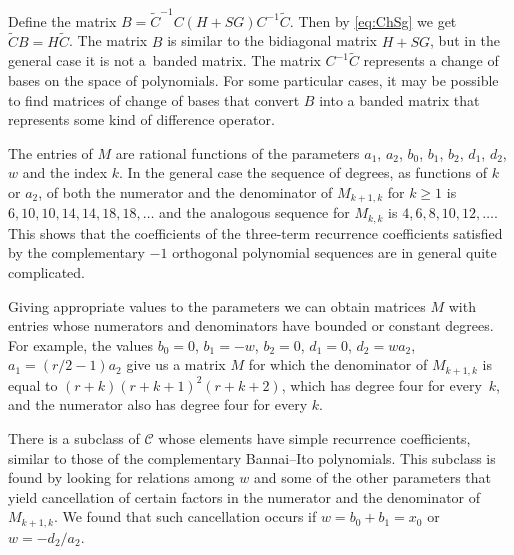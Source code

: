 \documentclass[pdftex]{sigma}
\def\cC{\mathcal C}
\numberwithin{equation}{section}
\begin{document}
Define the matrix
$%
	B={\tilde C}^{-1} C (H+S G)C^{-1} \tilde C$.
Then by \eqref{eq:ChSg} we get
$
	\tilde C B = H \tilde C$.
The matrix $B$ is similar to the bidiagonal matrix $H+ S G$, but in the general case it is not a~banded matrix. The matrix $C^{-1} \tilde C$ represents a change of bases on the space of polynomials. For some particular cases, it may be possible to find matrices of change of bases that convert $B$ into a banded matrix that represents some kind of difference operator.

The entries of $M$ are rational functions of the parameters $a_1$, $a_2$, $b_0$, $b_1$, $b_2$, $d_1$, $d_2$, $w$ and the index $k$. In the general case the sequence of degrees, as functions of $k$ or $a_2$, of both the numerator and the denominator of $M_{k+1,k} $ for $k\ge 1 $ is $6,10,10,14,14,18,18,\dots $ and the analogous sequence for $M_{k,k}$ is $ 4,6,8,10,12,\dots$. This shows that the coefficients of the three-term recurrence coefficients satisfied by the complementary $-1$ orthogonal polynomial sequences are in general quite complicated.

Giving appropriate values to the parameters we can obtain matrices $M$ with entries whose numerators and denominators have bounded or constant degrees. For example, the values ${b_0=0}$, $b_1=-w$, $b_2=0$, $d_1=0$, $d_2=w a_2$, $a_1=(r/2 -1)a_2$ give us a matrix $M$ for which the denominator of $M_{k+1,k}$ is equal to $(r+k)(r+k+1)^2 (r+k+2)$, which has degree four for every~$k$, and the numerator also has degree four for every $k$.


There is a subclass of $\cC$ whose elements have simple recurrence coefficients, similar to those of the complementary Bannai--Ito polynomials.
This subclass is found by looking for relations among $w$ and some of the other parameters that yield cancellation of certain factors in the numerator and the denominator of $M_{k+1,k}$. We found that such cancellation occurs if ${w=b_0+b_1=x_0}$ or $w=-d_2/a_2$.
\end{document}
